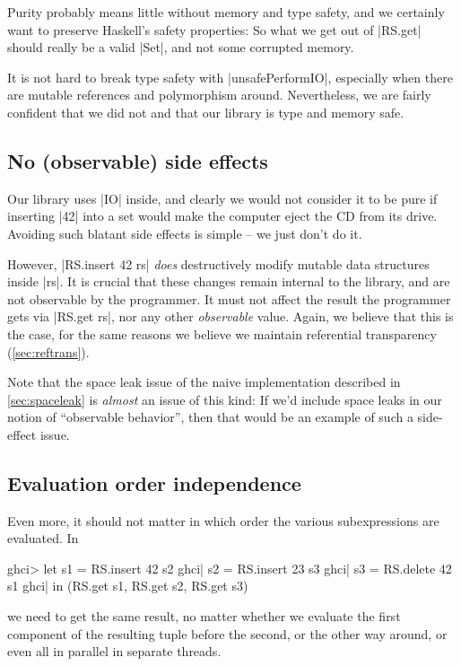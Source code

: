 \documentclass[manuscript,review,screen,acmsmall]{acmart}
\begin{document}
Purity probably means little without memory and type safety, and we certainly want to preserve Haskell's safety properties: So what we get out of |RS.get| should really be a valid |Set|, and not some corrupted memory.

It is not hard to break type safety with |unsafePerformIO|, especially when there are mutable references and polymorphism around. Nevertheless, we are fairly confident that we did not and that our library is type and memory safe.

\subsection{No (observable) side effects}

Our library uses |IO| inside, and clearly we would not consider it to be pure if inserting |42| into a set would make the computer eject the CD from its drive. Avoiding such blatant side effects is simple -- we just don't do it.

However, |RS.insert 42 rs| \emph{does} destructively modify mutable data structures inside |rs|. It is crucial that these changes remain internal to the library, and are not observable by the programmer. It must not affect the result the programmer gets via |RS.get rs|, nor any other \emph{observable} value. Again, we believe that this is the case, for the same reasons we believe we maintain referential transparency (\cref{sec:reftrans}).

Note that the space leak issue of the naive implementation described in \cref{sec:spaceleak} is \emph{almost} an issue of this kind: If we’d include space leaks in our notion of “observable behavior”, then that would be an example of such a side-effect issue.

\subsection{Evaluation order independence}

Even more, it should not matter in which order the various subexpressions are evaluated. In
\begin{code}
ghci>  let  s1 = RS.insert 42 s2
ghci|       s2 = RS.insert 23 s3
ghci|       s3 = RS.delete 42 s1
ghci|  in (RS.get s1, RS.get s2, RS.get s3)
\end{code}
we need to get the same result, no matter whether we evaluate the first component of the resulting tuple before the second, or the other way around, or even all in parallel in separate threads.
\end{document}
